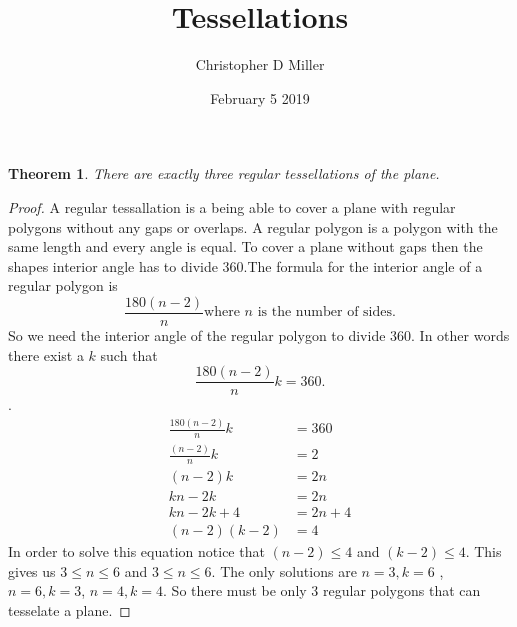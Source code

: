 \documentclass[12pt]{article}
\title{Tessellations}
\author{Christopher D Miller}
\date{February 5 2019}
\theoremstyle{plain}
\newtheorem{theorem}{Theorem}
\begin{document}
\maketitle



\begin{theorem}
    There are exactly three regular tessellations of the plane.
\end{theorem}
\begin{proof}
    A regular tessallation is a being able to cover a plane with regular polygons without any gaps or overlaps. A regular polygon is a polygon with the same length and every angle is equal. To cover a plane without gaps then the shapes interior angle has to divide 360.The formula for the interior angle of a regular polygon is $$\frac{180(n-2)}{n} \text{where } n \text{ is the number of sides}.$$
    So we need the interior angle of the regular polygon to divide 360. In other words there exist a $k$ such that $$\frac{180(n-2)}{n}k = 360 .$$. 
    \begin{align*}
        \frac{180(n-2)}{n}k& = 360\\
        \frac{(n-2)}{n}k& = 2\\
        (n-2)k& = 2n\\
        kn-2k& = 2n\\
        kn-2k + 4 &= 2n+4\\
        (n-2)(k-2) &=4
    \end{align*}
    In order to solve this equation notice that $(n-2)\leq 4$ and $(k-2)\leq 4$. This gives us $3\leq n \leq 6$ and $3\leq n \leq 6$. The only solutions are $n = 3 ,k =6$ , $n=6,k=3$, $n=4,k=4$. So there must be only 3 regular polygons that can tesselate a plane. 
\end{proof}
\end{document}
